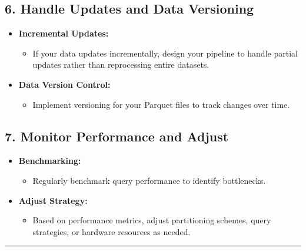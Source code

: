 \documentclass[
  american,
  10,
  a4paper,
]{book}
\providecommand{\tightlist}{%
  \setlength{\itemsep}{0pt}\setlength{\parskip}{0pt}}
\theoremstyle{definition}
\theoremstyle{remark}
\begin{document}
\subsection{\texorpdfstring{\textbf{6. Handle Updates and Data
Versioning}}{6. Handle Updates and Data Versioning}}\label{handle-updates-and-data-versioning}

\begin{itemize}
\item
  \textbf{Incremental Updates:}

  \begin{itemize}
  \tightlist
  \item
    If your data updates incrementally, design your pipeline to handle
    partial updates rather than reprocessing entire datasets.
  \end{itemize}
\item
  \textbf{Data Version Control:}

  \begin{itemize}
  \tightlist
  \item
    Implement versioning for your Parquet files to track changes over
    time.
  \end{itemize}
\end{itemize}

\subsection{\texorpdfstring{\textbf{7. Monitor Performance and
Adjust}}{7. Monitor Performance and Adjust}}\label{monitor-performance-and-adjust}

\begin{itemize}
\item
  \textbf{Benchmarking:}

  \begin{itemize}
  \tightlist
  \item
    Regularly benchmark query performance to identify bottlenecks.
  \end{itemize}
\item
  \textbf{Adjust Strategy:}

  \begin{itemize}
  \tightlist
  \item
    Based on performance metrics, adjust partitioning schemes, query
    strategies, or hardware resources as needed.
  \end{itemize}
\end{itemize}

\begin{center}\rule{0.5\linewidth}{0.5pt}\end{center}
\end{document}
